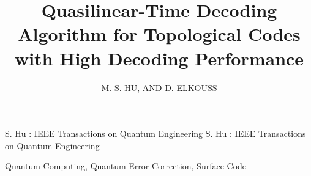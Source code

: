 \documentclass{ieeeaccess}
\begin{document}

\title{Quasilinear-Time Decoding Algorithm for Topological Codes with High Decoding Performance}
\author{
    \uppercase{M. S. Hu},
    \uppercase{and D. Elkouss}
}
\address[1]{Department of Physics, Delft University of Technology (email: watermarkhu@outlook.com)}
\address[2]{QuTech, Delft University of Technology, Lorentzweg 1, 2628CJ Delft, The Netherlands (email: d.elkousscoronas@qutech.nl)}


\markboth
{S. Hu \headeretal: IEEE Transactions on Quantum Engineering}
{S. Hu \headeretal: IEEE Transactions on Quantum Engineering}


\begin{abstract}
    
\end{abstract}

\begin{keywords}
    Quantum Computing, Quantum Error Correction, Surface Code
\end{keywords}

\titlepgskip=-30pt
\maketitle







\FloatBarrier




\EOD
\end{document}
